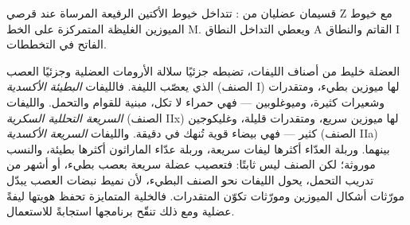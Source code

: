 \begin{omfigure}

{\small قسيمان عضليان من : تتداخل خيوط الأكتين الرفيعة المرساة
عند قرصي Z مع خيوط الميوزين الغليظة المتمركزة على
الخط M. ويعطي التداخل النطاق A القاتم والنطاق I الفاتح في
التخططات.}
\end{omfigure}

\begin{proposition}\label{prop:b2:cell-differentiation:types}
العضلة خليط من أصناف الليفات، تضبطه جزئيًا سلالة الأرومات
العضلية وجزئيًا العصب الذي يعصّب الليفة.
فالليفات \emph{البطيئة الأكسدية} (الصنف I) لها ميوزين بطيء، ومتقدرات
وشعيرات كثيرة، وميوغلوبين --- فهي حمراء لا تكل،
مبنية للقوام والتحمل. والليفات \emph{السريعة التحللية السكرية} (الصنف IIx)
لها ميوزين سريع، ومتقدرات قليلة، وغليكوجين كثير ---
فهي بيضاء قوية تُنهك في دقيقة. والليفات \emph{السريعة الأكسدية}
(الصنف IIa) بينهما. وربلة العدّاء أكثرها ليفات
سريعة، وربلة عدّاء الماراثون أكثرها بطيئة، والنسب
موروثة؛ لكن الصنف ليس ثابتًا: فتعصيب عضلة سريعة
بعصب بطيء، أو أشهر من تدريب التحمل، يحول
الليفات نحو الصنف البطيء، لأن نميط نبضات العصب
يبدّل مورّثات أشكال الميوزين ومورّثات تكوّن المتقدرات.
فالخلية المتمايزة تحفظ هويتها ليفةً
عضلية ومع ذلك تنقّح برنامجها استجابةً للاستعمال.
\end{proposition}

